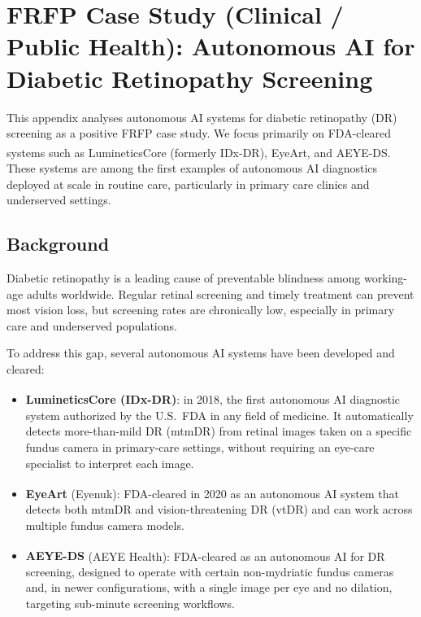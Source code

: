 
\section{FRFP Case Study (Clinical / Public Health):
  Autonomous AI for Diabetic Retinopathy Screening}
\label{app:frfp-dr-ai}

This appendix analyses autonomous AI systems for diabetic retinopathy (DR)
screening as a positive FRFP case study.
We focus primarily on FDA-cleared systems such as
LumineticsCore\textsuperscript{\textregistered} (formerly IDx-DR),
EyeArt\textsuperscript{\textregistered}, and
AEYE-DS\textsuperscript{\textregistered}.
These systems are among the first examples of autonomous AI diagnostics
deployed at scale in routine care, particularly in primary care clinics and
underserved settings.

\subsection{Background}

Diabetic retinopathy is a leading cause of preventable blindness among
working-age adults worldwide.
Regular retinal screening and timely treatment can prevent most vision loss,
but screening rates are chronically low, especially in primary care and
underserved populations.

To address this gap, several autonomous AI systems have been developed and
cleared:

\begin{itemize}
  \item \textbf{LumineticsCore\textsuperscript{\textregistered}
        (IDx-DR)}:
        in 2018, the first autonomous AI diagnostic system authorized by the
        U.S.\ FDA in any field of medicine.
        It automatically detects more-than-mild DR (mtmDR) from retinal
        images taken on a specific fundus camera in primary-care settings,
        without requiring an eye-care specialist to interpret each image.
  \item \textbf{EyeArt\textsuperscript{\textregistered}} (Eyenuk):
        FDA-cleared in 2020 as an autonomous AI system that detects both
        mtmDR and vision-threatening DR (vtDR) and can work across multiple
        fundus camera models.
  \item \textbf{AEYE-DS\textsuperscript{\textregistered}} (AEYE Health):
        FDA-cleared as an autonomous AI for DR screening, designed to
        operate with certain non-mydriatic fundus cameras and, in newer
        configurations, with a single image per eye and no dilation,
        targeting sub-minute screening workflows.
\end{itemize}

